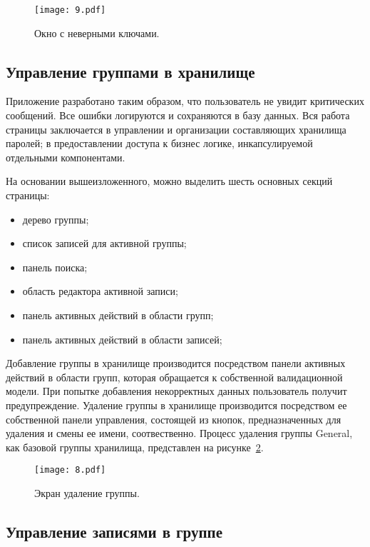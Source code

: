 \begin{figure}[ht]
\centering
  \texttt{[image: 9.pdf]}
  \caption{ Окно с неверными ключами. }
  \label{fig:document:auth:nein}
\end{figure}

\subsection{Управление группами в хранилище}
\label{sec:document:created_groupe}

Приложение разработано таким образом, что пользователь не увидит критических сообщений. Все ошибки логируются и сохраняются в базу данных.
Вся работа страницы заключается в управлении и организации составляющих хранилища паролей; в предоставлении доступа к бизнес логике, инкапсулируемой отдельными компонентами.

На основании вышеизложенного, можно выделить шесть основных секций страницы:
\begin{itemize}
	\item дерево группы;
	\item список записей для активной группы;
	\item панель поиска;
	\item область редактора активной записи;
	\item панель активных действий в области групп;
	\item панель активных действий в области записей;
\end{itemize}

Добавление группы в хранилище производится посредством панели активных действий в области групп, которая обращается к собственной валидационной модели. При попытке добавления некорректных данных пользователь получит предупреждение.
Удаление группы в хранилище производится посредством ее собственной панели управления, состоящей из кнопок, предназначенных для удаления и смены ее имени, соотвественно. Процесс удаления группы General, как базовой группы хранилища, представлен на рисунке~\ref{fig:document:created_group:eith}.

\begin{figure}[ht]
\centering
  \texttt{[image: 8.pdf]}
  \caption{ Экран удаление группы. }
  \label{fig:document:created_group:eith}
\end{figure}

\subsection{Управление записями в группе}
\label{sec:document:created_entry}

